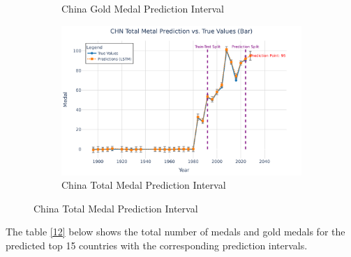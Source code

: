 \documentclass{mcmthesis}
\begin{document}
\begin{figure}[H]
\begin{subfigure}[b]{0.48\textwidth}
		\caption{China Gold Medal Prediction Interval}
		\label{fig:chn_gold}
	\end{subfigure}
	\hfill
	\begin{subfigure}[b]{0.48\textwidth}
		\includegraphics[width=\textwidth]{fig/CHN Total Metal Prediction vs. True Values (Bar).png}
		\caption{China Total Medal Prediction Interval}
		\label{fig:chn_total}
	\end{subfigure}
	
\end{figure}
The table \ref{12} below shows the total number of medals and gold medals for the predicted top 15 countries with the corresponding prediction intervals.
\end{document}
